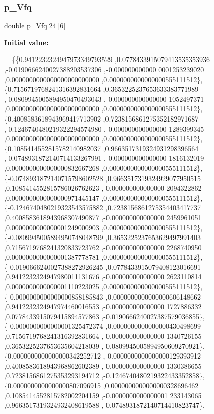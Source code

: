 \subsubsection{\texorpdfstring{p\+\_\+\+Vfq}{p\_Vfq}}
{\footnotesize\ttfamily double p\+\_\+\+Vfq\mbox{[}24\mbox{]}\mbox{[}6\mbox{]}}

{\bfseries Initial value\+:}
\begin{DoxyCode}
= \{\{0.9412232324947973349793529 ,0.0778433915079413535353936 ,-0.0190666240027388203537306 ,-0.000000000000
      0001253239020 ,0.0000000000000000000000000 ,0.0000000000000000555111512\},
\{0.7156719768241316392831664 ,0.3653225237653633383771989 ,-0.0809945005894950470493043 ,-0.000000000000000
      1052497371 ,0.0000000000000000000000000 ,0.0000000000000000555111512\},
\{0.4008583618943969417713902 ,0.7238156861275352182971687 ,-0.1246740480219322294574980 ,-0.000000000000000
      1289399345 ,0.0000000000000000000000000 ,0.0000000000000000555111512\},
\{0.1085414552815782140982037 ,0.9663517319324931298396564 ,-0.0748931872140714133267991 ,-0.000000000000000
      1816132019 ,0.0000000000000000832667268 ,0.0000000000000000555111512\},
\{-0.0748931872140715798602528 ,0.9663517319324929077950515 ,0.1085414552815786026762623 ,-0.000000000000000
      2094322862 ,0.0000000000000000971445147 ,0.0000000000000000555111512\},
\{-0.1246740480219323543575882 ,0.7238156861275354403417737 ,0.4008583618943968307490877 ,-0.000000000000000
      2459961051 ,0.0000000000000001249000903 ,0.0000000000000000555111512\},
\{-0.0809945005894950748048799 ,0.3653225237653629497991403 ,0.7156719768241320833723762 ,-0.000000000000000
      2268740950 ,0.0000000000000001387778781 ,0.0000000000000000555111512\},
\{-0.0190666240027388272926245 ,0.0778433915079408123016691 ,0.9412232324947980011131676 ,-0.000000000000000
      2623110814 ,0.0000000000000001110223025 ,0.0000000000000000555111512\},
\{-0.0000000000000000858185843 ,0.0000000000000000606148662 ,0.9412232324947974460016553 ,-0.000000000000000
      1727886332 ,0.0778433915079415894577863 ,-0.0190666240027387579036855\},
\{-0.0000000000000001325472374 ,0.0000000000000000430498699 ,0.7156719768241316392831664 ,-0.000000000000000
      1340726155 ,0.3653225237653635604218039 ,-0.0809945005894950609270921\},
\{0.0000000000000000342252712 ,-0.0000000000000000129393912 ,0.4008583618943968862602389 ,-0.000000000000000
      1330386655 ,0.7238156861275353293194712 ,-0.1246740480219322433352858\},
\{0.0000000000000000807096915 ,0.0000000000000000328696462 ,0.1085414552815782002204159 ,-0.0000000000000001
      233143065 ,0.9663517319324932408619588 ,-0.0748931872140714410823747\},

\end{DoxyCode}
